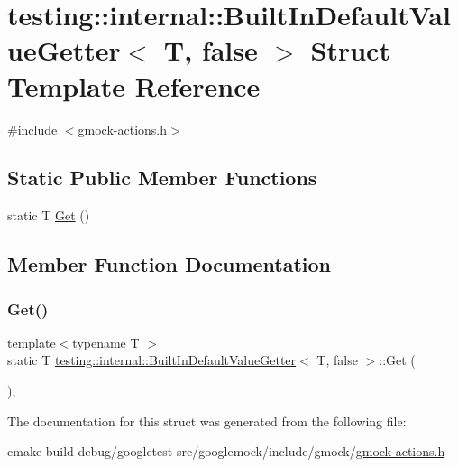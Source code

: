 \hypertarget{structtesting_1_1internal_1_1BuiltInDefaultValueGetter_3_01T_00_01false_01_4}{}\section{testing\+::internal\+::Built\+In\+Default\+Value\+Getter$<$ T, false $>$ Struct Template Reference}
\label{structtesting_1_1internal_1_1BuiltInDefaultValueGetter_3_01T_00_01false_01_4}


{\ttfamily \#include $<$gmock-\/actions.\+h$>$}

\subsection*{Static Public Member Functions}
\begin{DoxyCompactItemize}
\item 
static T \mbox{\hyperlink{structtesting_1_1internal_1_1BuiltInDefaultValueGetter_3_01T_00_01false_01_4_a8c8e929666f61272961eea21a60de4ad}{Get}} ()
\end{DoxyCompactItemize}


\subsection{Member Function Documentation}
\mbox{\label{structtesting_1_1internal_1_1BuiltInDefaultValueGetter_3_01T_00_01false_01_4_a8c8e929666f61272961eea21a60de4ad}} 
\subsubsection{\texorpdfstring{Get()}{Get()}}
{\footnotesize\ttfamily template$<$typename T $>$ \\
static T \mbox{\hyperlink{structtesting_1_1internal_1_1BuiltInDefaultValueGetter}{testing\+::internal\+::\+Built\+In\+Default\+Value\+Getter}}$<$ T, false $>$\+::Get (\begin{DoxyParamCaption}{ }\end{DoxyParamCaption})\hspace{0.3cm}{\ttfamily [inline]}, {\ttfamily [static]}}



The documentation for this struct was generated from the following file\+:\begin{DoxyCompactItemize}
\item 
cmake-\/build-\/debug/googletest-\/src/googlemock/include/gmock/\mbox{\hyperlink{gmock-actions_8h}{gmock-\/actions.\+h}}\end{DoxyCompactItemize}
